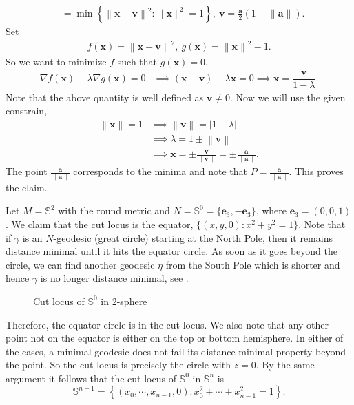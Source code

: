 \begin{eg}
\begin{align*}
        & = \min \left\{\left\|\mathbf{x}-{\mathbf{v}}\right\|^2:\|\mathbf{x}\|^2=1\right\},~\mathbf{v}=\frac{\mathbf{a}}{2}(1-\left\|\mathbf{a}\right\|).
    \end{align*}
    Set
    \begin{align*}
        f(\mathbf{x})=\left\|\mathbf{x}-\mathbf{v}\right\|^2,~g(\mathbf{x})= \left\|\mathbf{x}\right\|^2-1.
    \end{align*}
    So we want to minimize $f$ such that $g(\mathbf{x})=0$. 
    \begin{align*}
       \nabla f(\mathbf{x}) - \lambda \nabla g(\mathbf{x})= 0 & \implies (\mathbf{x}-\mathbf{v}) - \lambda \mathbf{x} = 0  \implies \mathbf{x} = \dfrac{\mathbf{v}}{1-\lambda}.
    \end{align*}
    Note that  the above quantity is well defined as $\mathbf{v}\neq 0$. Now we will use the given constrain,
    \begin{align*}
        \left\|\mathbf{x}\right\|=1 & \implies \left\|\mathbf{v}\right\|=|1-\lambda| \\
        & \implies \lambda = 1 \pm \left\|\mathbf{v}\right\| \\
        & \implies \mathbf{x} = \pm \frac{\mathbf{v}}{\left\|\mathbf{v}\right\|} = \pm \frac{\mathbf{a}}{\left\|\mathbf{a}\right\|}.
    \end{align*}
    The point $\frac{\mathbf{a}}{\left\|\mathbf{a}\right\|}$ corresponds to the minima and note that $P=\frac{\mathbf{a}}{\left\|\mathbf{a}\right\|}$. This proves the claim.
\end{eg}

\begin{eg}\label{eg:cutLocusOfS0}
    Let $M=\mathbb{S}^2$ with the round metric and $N=\mathbb{S}^0=\{\mathbf{e}_3,-\mathbf{e}_3\}$, where $\mathbf{e}_3=(0,0,1)$. We claim that the cut locus is the equator, $\{(x,y,0):x^2+y^2=1\}$. Note that if $\gamma$ is an $N$-geodesic (great circle) starting at the North Pole, then it remains distance minimal until it hits the equator circle. As soon as it goes beyond the circle, we can find another geodesic $\eta$ from the South Pole which is shorter and hence $\gamma$ is no longer distance minimal, see . 
    \begin{figure}[!htb]
        \centering
        \caption{Cut locus of $\mathbb{S}^0$ in $2$-sphere \label{fig:Example-CutLocus-SphereS0}}
    \end{figure}

    \noindent Therefore, the equator circle is in the cut locus. We also note that any other point not on the equator is either on the top or bottom hemisphere. In either of the cases, a minimal geodesic does not fail its distance minimal property beyond the point. So the cut locus is precisely the circle with $z=0$. By the same argument it follows that the cut locus of $\mathbb{S}^0$ in $\mathbb{S}^n$ is
    \begin{displaymath}
        \mathbb{S}^{n-1}= \left\{(x_0,\cdots,x_{n-1},0): x_0^2+\cdots+x_{n-1}^2=1\right\}.
    \end{displaymath}
\end{eg}

